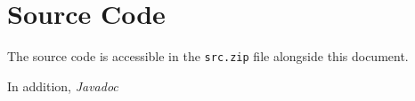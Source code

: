 \section{Source Code}

The source code is accessible in the \texttt{src.zip} file alongside this document.

In addition, \textit{Javadoc} 